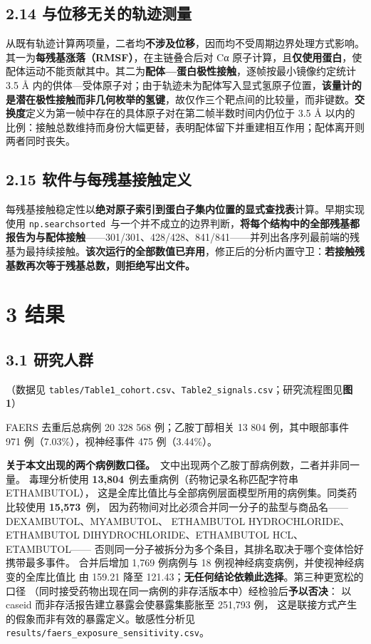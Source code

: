\documentclass[UTF8,fontset=windows,11pt]{ctexart}
\begin{document}
\subsection{2.14 与位移无关的轨迹测量}

从既有轨迹计算两项量，二者均\textbf{不涉及位移}，因而均不受周期边界处理方式影响。其一为\textbf{每残基涨落（RMSF）}，在主链叠合后对 Cα 原子计算，且\textbf{仅使用蛋白}，使配体运动不能贡献其中。其二为\textbf{配体—蛋白极性接触}，逐帧按最小镜像约定统计 3.5 Å 内的供体—受体原子对；由于轨迹未为配体写入显式氢原子位置，\textbf{该量计的是潜在极性接触而非几何枚举的氢键}，故仅作三个靶点间的比较量，而非键数。\textbf{交换度}定义为第一帧中存在的具体原子对在第二帧半数时间内仍位于 3.5 Å 以内的比例：接触总数维持而身份大幅更替，表明配体留下并重建相互作用；配体离开则两者同时丧失。

\subsection{2.15 软件与每残基接触定义}

每残基接触稳定性以\textbf{绝对原子索引到蛋白子集内位置的显式查找表}计算。早期实现使用 \texttt{np.searchsorted}\ 与一个并不成立的边界判断，\textbf{将每个结构中的全部残基都报告为与配体接触}——301/301、428/428、841/841——并列出各序列最前端的残基为最持续接触。\textbf{该次运行的全部数值已弃用}，修正后的分析内置守卫：\textbf{若接触残基数再次等于残基总数，则拒绝写出文件。}

\section{3 结果}

\subsection{3.1 研究人群}

（数据见 \texttt{tables/Table1\_cohort.csv}、\texttt{Table2\_signals.csv}；研究流程图见\textbf{图1}）

FAERS 去重后总病例 20 328 568 例；乙胺丁醇相关 13 804 例，其中眼部事件 971 例（7.03\%），视神经事件 475 例（3.44\%）。

\textbf{关于本文出现的两个病例数口径。}\ 文中出现两个乙胺丁醇病例数，二者并非同一量。 毒理分析使用 \textbf{13,804}\ 例去重病例（药物记录名称匹配字符串 ETHAMBUTOL）， 这是全库比值比与全部病例层面模型所用的病例集。同类药比较使用 \textbf{15,573}\ 例， 因为药物间对比必须合并同一分子的盐型与商品名——DEXAMBUTOL、MYAMBUTOL、 ETHAMBUTOL HYDROCHLORIDE、ETHAMBUTOL DIHYDROCHLORIDE、ETHAMBUTOL HCL、ETAMBUTOL—— 否则同一分子被拆分为多个条目，其排名取决于哪个变体恰好携带最多事件。 合并后增加 1,769 例病例与 18 例视神经病变病例，并使视神经病变的全库比值比 由 159.21 降至 121.43；\textbf{无任何结论依赖此选择}。第三种更宽松的口径 （同时接受药物出现在同一病例的非存活版本中）经检验后\textbf{予以否决}： 以 caseid 而非存活报告建立暴露会使暴露集膨胀至 251,793 例， 这是联接方式产生的假象而非有效的暴露定义。敏感性分析见 \texttt{results/faers\_exposure\_sensitivity.csv}。
\end{document}
